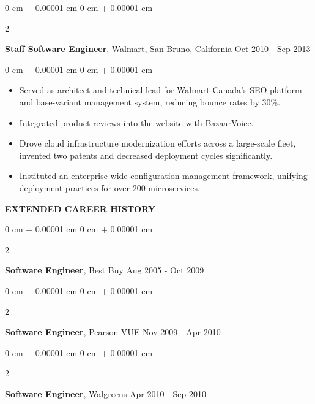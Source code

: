 \documentclass[10pt, letterpaper]{article}
\newenvironment{highlights}{
    \begin{itemize}[
        topsep=0.10 cm,
        parsep=0.10 cm,
        partopsep=0pt,
        itemsep=0pt,
        leftmargin=0 cm + 10pt
    ]
}{
    \end{itemize}
} %
\newenvironment{onecolentry}{
    \begin{adjustwidth}{
        0 cm + 0.00001 cm
    }{
        0 cm + 0.00001 cm
    }
}{
    \end{adjustwidth}
} %
\newenvironment{twocolentry}[2][]{
    \onecolentry
    \def\secondColumn{#2}
    \setcolumnwidth{\fill, 4.5 cm}
    \begin{paracol}{2}
}{
    \switchcolumn \raggedleft \secondColumn
    \end{paracol}
    \endonecolentry
} %
\begin{document}
        \vspace{0.20 cm}
        \begin{twocolentry}{
            Oct 2010 - Sep 2013
        }
            \textbf{Staff Software Engineer}, Walmart, San Bruno, California\end{twocolentry}
        \vspace{0.10 cm}
        \begin{onecolentry}
            \begin{highlights}
                \item Served as architect and technical lead for Walmart Canada's SEO platform and base-variant management system, reducing bounce rates by 30\%.
                \item Integrated product reviews into the website with BazaarVoice.
                \item Drove cloud infrastructure modernization efforts across a large-scale fleet, invented two patents and decreased deployment cycles significantly.
                \item Instituted an enterprise-wide configuration management framework, unifying deployment practices for over 200 microservices.
            \end{highlights}
        \end{onecolentry}

        \vspace{0.20 cm}
        \textbf{EXTENDED CAREER HISTORY}
        
        \vspace{0.10 cm}
        \begin{twocolentry}{
            Aug 2005 - Oct 2009
        }
            \textbf{Software Engineer}, Best Buy\end{twocolentry}
        
        \vspace{0.10 cm}
        \begin{twocolentry}{
            Nov 2009 - Apr 2010
        }
            \textbf{Software Engineer}, Pearson VUE\end{twocolentry}
        
        \vspace{0.10 cm}
        \begin{twocolentry}{
            Apr 2010 - Sep 2010
        }
            \textbf{Software Engineer}, Walgreens\end{twocolentry}
\end{document}
